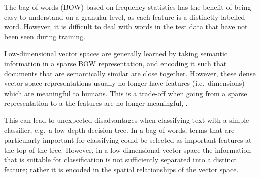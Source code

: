
The bag-of-words (BOW) based on frequency statistics has the benefit of being easy to understand on a granular level, as each feature is a distinctly labelled word. However, it is difficult to deal with words in the test data that have not been seen during training. 


Low-dimensional vector spaces \cite{Hofmann1999} are generally learned by taking  semantic information  in a sparse BOW representation, and encoding it  such that documents that are semantically similar are close together. However, these dense vector space representations usually no longer have features (i.e.\ dimensions) which are meaningful to humans. This is a trade-off when going from a sparse representation to a  the features are no longer meaningful, . 

This can lead to unexpected disadvantages when classifying text with a simple classifier, e.g.\ a low-depth decision tree. In a bag-of-words, terms that are particularly important for classifying could be selected as important features at the top of the tree. However, in a low-dimensional vector space the information that is suitable for classification is not sufficiently separated into a distinct feature; rather it is encoded in the spatial relationships of the vector space.%

